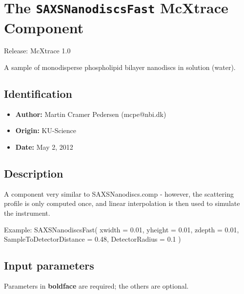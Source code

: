 \section{The \texttt{SAXSNanodiscsFast} McXtrace Component}
Release: McXtrace 1.0

A sample of monodisperse phospholipid bilayer nanodiscs in solution (water).

\subsection*{Identification}
\begin{itemize}
  \item \textbf{Author:} Martin Cramer Pedersen (mcpe@nbi.dk)
  \item \textbf{Origin:} KU-Science
  \item \textbf{Date:} May 2, 2012
\end{itemize}

\subsection*{Description}
A component very similar to SAXSNanodiscs.comp - however, the scattering profile is only computed once, and linear interpolation is then used to simulate the instrument.

Example: SAXSNanodiscsFast( xwidth = 0.01, yheight = 0.01, zdepth = 0.01, SampleToDetectorDistance = 0.48, DetectorRadius = 0.1 )

\subsection*{Input parameters}
Parameters in \textbf{boldface} are required; the others are optional.

